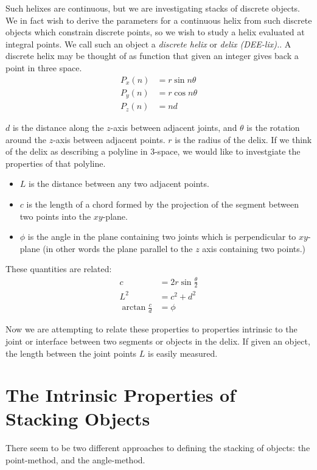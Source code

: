 \documentclass[11pt]{article}
\begin{document}
Such helixes are continuous, but we are investigating stacks of discrete objects. We in fact wish to derive
the parameters for a continuous helix from such discrete objects which constrain discrete points, so we wish
to study a helix evaluated at integral points. We call such an object a {\em discrete helix} or {\em delix (DEE-lix).}.
A discrete helix may be thought of as function that given an integer gives back a point in three space.
\begin{align*}
    P_x(n) &= r \sin{n \theta}  \\
    P_y(n) &= r \cos{n \theta} \\
   P_z(n) &= n d
\end{align*}

$d$ is the distance along the $z$-axis between adjacent joints, and $\theta$ is the rotation around the $z$-axis between adjacent points. $r$ is the radius of the delix. If we think of the delix as describing a polyline in 3-space, we would like to investgiate
the properties of that polyline.

\begin{itemize}
\item $L$ is the distance between any two adjacent points.
\item $c$ is the length of a chord formed by the projection of the segment between two points into the $xy$-plane.
\item $\phi$ is the angle in the plane containing two joints which is perpendicular to $xy$-plane
  (in other words the plane parallel to the $z$ axis containing two points.)
  \end{itemize}
These quantities are related:
\begin{align}
    c &= 2r\sin{\frac{\theta}{2}} \\
    L^2 &= c^2+d^2  \\
    \arctan{\frac{c}{d}}  &= \phi 
\end{align}

Now we are attempting to relate these properties to properties intrinsic to the joint or interface between
two segments or objects in the delix. If given an object, the length between the joint points $L$ is
easily measured.

\section{The Intrinsic Properties of Stacking Objects}

There seem to be two different approaches to defining the stacking of objects: the point-method,
and the angle-method.
\end{document}
